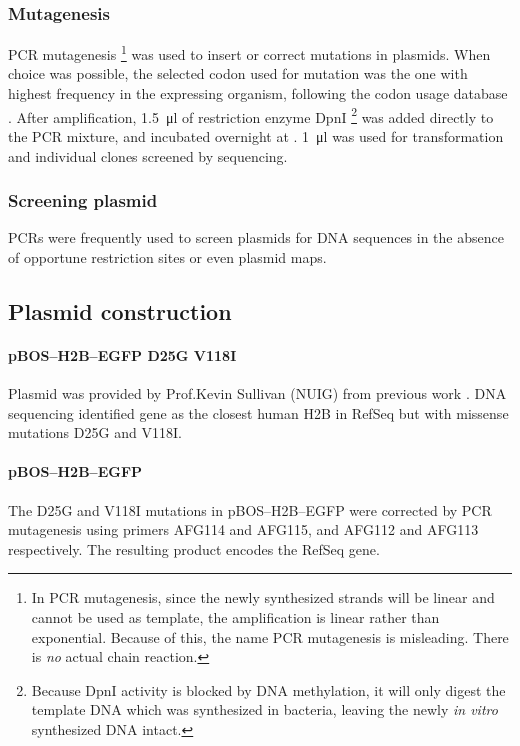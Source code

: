       \subsubsection{Mutagenesis}
        PCR mutagenesis
        \footnote{
          In PCR mutagenesis, since the newly synthesized strands will
          be linear and cannot be used as template, the amplification
          is linear rather than exponential. Because of this, the name
          PCR mutagenesis is misleading. There is \emph{no} actual chain reaction.
        }
        was used to insert or correct mutations in plasmids. When choice
        was possible, the selected codon used for mutation was the one
        with highest frequency in the expressing organism, following the
        codon usage database \citep{codon_usage}. After amplification,
        \SI{1.5}{\ul} of restriction enzyme DpnI
        \footnote{
          Because DpnI activity is blocked by DNA methylation, it will
          only digest the template DNA which was synthesized in bacteria,
          leaving the newly \textit{in vitro} synthesized DNA intact.
        }
        was added directly to the PCR mixture, and incubated overnight at
        . \SI{1}{\ul} was used for transformation and individual
        clones screened by sequencing.

      \subsubsection{Screening plasmid}
        PCRs were frequently used to screen plasmids for DNA sequences
        in the absence of opportune restriction sites or even plasmid maps.

    \subsection{Plasmid construction}

      \paragraph{pBOS--H2B--EGFP D25G V118I}
      Plasmid was provided by Prof.\@ Kevin Sullivan (NUIG) from
      previous work \citep{KevinH2BGFP}.  DNA sequencing identified
      gene  as the closest human H2B in RefSeq but
      with missense mutations D25G and V118I.

      \paragraph{pBOS--H2B--EGFP}
      The D25G and V118I mutations in pBOS--H2B--EGFP were corrected
      by PCR mutagenesis using primers AFG114 and AFG115, and AFG112
      and AFG113 respectively.  The resulting product encodes the
       RefSeq gene.

